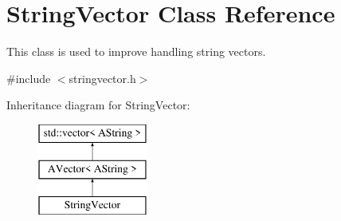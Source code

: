 \hypertarget{class_string_vector}{}\section{String\+Vector Class Reference}
\label{class_string_vector}


This class is used to improve handling string vectors.  




{\ttfamily \#include $<$stringvector.\+h$>$}

Inheritance diagram for String\+Vector\+:\begin{figure}[H]
\begin{center}
\leavevmode
\includegraphics[height=3.000000cm]{class_string_vector}
\end{center}
\end{figure}
